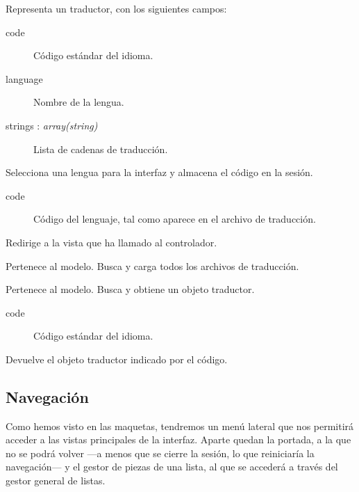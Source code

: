 \begin{description}[style=nextline]
	\item[Estructura \textit{Translator}]
	Representa un traductor, con los siguientes campos:
	
	\begin{description}
		\item[code] Código estándar del idioma.
		\item[language] Nombre de la lengua.
		\item[strings : \textit{array(string)}] Lista de cadenas de traducción.
	\end{description}
	
	\item[language (code)]
	Selecciona una lengua para la interfaz y almacena el código en la sesión.
	
	\begin{description}
		\item[code] Código del lenguaje, tal como aparece en el archivo de traducción.
	\end{description}
	
	Redirige a la vista que ha llamado al controlador.
	
	\item[translator ()]
	Pertenece al modelo. Busca y carga todos los archivos de traducción.
	
	\item[get\_translator (code)]
	Pertenece al modelo. Busca y obtiene un objeto traductor.
	
	\begin{description}
		\item[code] Código estándar del idioma.
	\end{description}
	
	Devuelve el objeto traductor indicado por el código.
\end{description}

\subsection{Navegación}

Como hemos visto en las maquetas, tendremos un menú lateral que nos permitirá acceder a las vistas principales de la interfaz. Aparte quedan la portada, a la que no se podrá volver ---a menos que se cierre la sesión, lo que reiniciaría la navegación--- y el gestor de piezas de una lista, al que se accederá a través del gestor general de listas.

